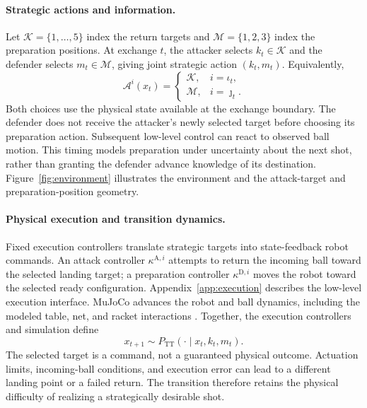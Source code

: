 \documentclass[pmlr]{jmlr}
\newcommand{\Actions}{\mathcal{A}}
\newcommand{\attack}{\mathrm{A}}
\newcommand{\defend}{\mathrm{D}}
\begin{document}
\paragraph{Strategic actions and information.}
Let $\mathcal{K}=\{1,\ldots,5\}$ index the return targets and $\mathcal{M}=\{1,2,3\}$ index the preparation positions. At exchange $t$, the attacker selects $k_t\in\mathcal{K}$ and the defender selects $m_t\in\mathcal{M}$, giving joint strategic action $(k_t,m_t)$. Equivalently,
\begin{equation}
  \Actions^i(x_t)=
  \begin{cases}
    \mathcal{K}, & i=\iota_t,\\
    \mathcal{M}, & i=\jmath_t.
  \end{cases}
  \label{eq:actions}
\end{equation}
Both choices use the physical state available at the exchange boundary. The defender does not receive the attacker's newly selected target before choosing its preparation action. Subsequent low-level control can react to observed ball motion. This timing models preparation under uncertainty about the next shot, rather than granting the defender advance knowledge of its destination. Figure~\ref{fig:environment} illustrates the environment and the attack-target and preparation-position geometry.

\paragraph{Physical execution and transition dynamics.}
Fixed execution controllers translate strategic targets into state-feedback robot commands. An attack controller $\kappa^{\attack,i}$ attempts to return the incoming ball toward the selected landing target; a preparation controller $\kappa^{\defend,i}$ moves the robot toward the selected ready configuration. Appendix~\ref{app:execution} describes the low-level execution interface. MuJoCo advances the robot and ball dynamics, including the modeled table, net, and racket interactions \citep{todorov2012mujoco}. Together, the execution controllers and simulation define
\begin{equation}
  x_{t+1}\sim P_{\mathrm{TT}}(\cdot\mid x_t,k_t,m_t).
  \label{eq:ttkernel}
\end{equation}
The selected target is a command, not a guaranteed physical outcome. Actuation limits, incoming-ball conditions, and execution error can lead to a different landing point or a failed return. The transition therefore retains the physical difficulty of realizing a strategically desirable shot.
\end{document}

